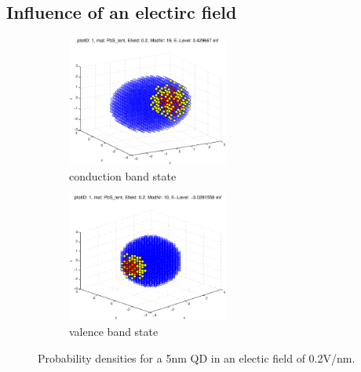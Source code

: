 	\FloatBarrier
\subsection{Influence of an electirc field}
\begin{figure}
	\centering
	\begin{subfigure}{200px}
		\includegraphics[width=200px]{Fig/Plots/r25v02CB}
		\caption{conduction band state}
	\end{subfigure}
	\begin{subfigure}{200px}
		\includegraphics[width=200px]{Fig/Plots/r25v02VB}
		\caption{valence band state}
	\end{subfigure}	
	\caption{Probability densities for a 5nm QD in an electic field of 0.2V/nm.}
	\label{fig:EfieldWaveFn}
\end{figure}
%
